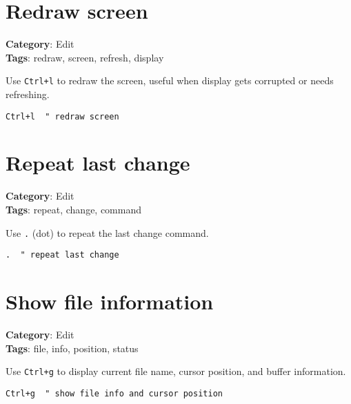 {{{{\section{Redraw screen}

\textbf{Category}: Edit\\ \textbf{Tags}: redraw, screen, refresh, display
\vspace{0.5cm}

Use {\footnotesize \Verb§Ctrl+l§} to redraw the screen, useful when display gets corrupted or needs refreshing.

\begin{Exa*}{}
\begin{Verbatim}[fontsize=\footnotesize, breaklines, breakanywhere]
Ctrl+l  " redraw screen
\end{Verbatim}
\end{Exa*}

\section{Repeat last change}

\textbf{Category}: Edit\\ \textbf{Tags}: repeat, change, command
\vspace{0.5cm}

Use {\footnotesize \Verb§.§} (dot) to repeat the last change command.

\begin{Exa*}{}
\begin{Verbatim}[fontsize=\footnotesize, breaklines, breakanywhere]
.  " repeat last change
\end{Verbatim}
\end{Exa*}

\section{Show file information}

\textbf{Category}: Edit\\ \textbf{Tags}: file, info, position, status
\vspace{0.5cm}

Use {\footnotesize \Verb§Ctrl+g§} to display current file name, cursor position, and buffer information.

\begin{Exa*}{}
\begin{Verbatim}[fontsize=\footnotesize, breaklines, breakanywhere]
Ctrl+g  " show file info and cursor position
\end{Verbatim}
\end{Exa*}

}}}}

